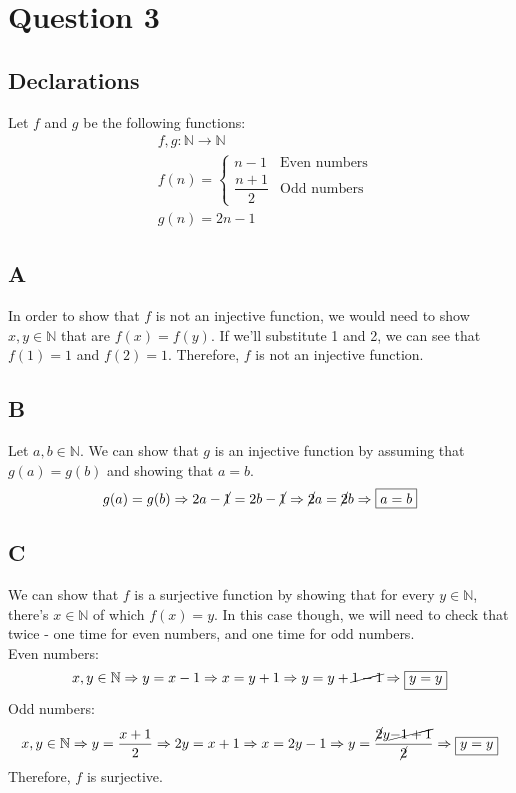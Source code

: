 \documentclass[12pt, oneside]{article}
\begin{document}
\clearpage

\section{Question 3}
\setcounter{subsection}{-1}
\subsection{Declarations}
Let $f$ and $g$ be the following functions:
\begin{eqnarray*}
& f, g: \mathbb{N} \rightarrow \mathbb{N}\\
& f(n) = 
  \begin{cases}
  	n - 1 & \text{Even numbers}\\
		\dfrac{n + 1}{2} & \text{Odd numbers}
  \end{cases}\\
& g(n) = 2n - 1
\end{eqnarray*}

\subsection{A}
In order to show that $f$ is not an injective function, we would need to show $x, y \in \mathbb{N}$ that are $f(x) = f(y)$. If we'll substitute 1 and 2, we can see that $f(1) = 1$ and $f(2) = 1$. Therefore, $f$ is not an injective function.

\subsection{B}
Let $a, b \in \mathbb{N}$.
We can show that $g$ is an injective function by assuming that $g(a) = g(b)$ and showing that $a = b$.
\begin{equation*}
g(a) = g(b) \Rightarrow
2a - \cancel{1} = 2b - \cancel{1} \Rightarrow
\cancel{2}a = \cancel{2}b \Rightarrow
\framebox{$a = b$}
\end{equation*}

\subsection{C}
We can show that $f$ is a surjective function by showing that for every $y \in \mathbb{N}$, there's $x \in \mathbb{N}$ of which $f(x) = y$. In this case though, we will need to check that twice - one time for even numbers, and one time for odd numbers.\\
Even numbers:
\begin{equation*}
x, y \in \mathbb{N} \Rightarrow
y = x - 1 \Rightarrow
x = y + 1 \Rightarrow
y = y + \cancel{1 - 1} \Rightarrow
\framebox{$y = y$}
\end{equation*}
Odd numbers:
\begin{equation*}
x, y \in \mathbb{N} \Rightarrow
y = \dfrac{x + 1}{2} \Rightarrow
2y = x + 1 \Rightarrow
x = 2y - 1 \Rightarrow
y = \dfrac{\cancel{2}y \cancel{- 1 + 1}}{\cancel{2}} \Rightarrow
\framebox{$y = y$}
\end{equation*}
Therefore, $f$ is surjective.
\clearpage
\end{document}
